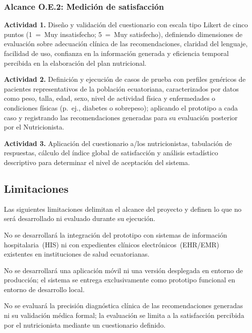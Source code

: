 \subsubsection{Alcance O.E.2: Medición de satisfacción}

\textbf{Actividad 1.} Diseño y validación del cuestionario con escala
tipo Likert de cinco puntos (1~=~Muy insatisfecho; 5~=~Muy satisfecho),
definiendo dimensiones de evaluación sobre adecuación clínica de las
recomendaciones, claridad del lenguaje, facilidad de uso, confianza
en la información generada y eficiencia temporal percibida en la
elaboración del plan nutricional.

\medskip

\textbf{Actividad 2.} Definición y ejecución de casos de prueba con
perfiles genéricos de pacientes representativos de la población
ecuatoriana, caracterizados por datos como peso, talla, edad, sexo,
nivel de actividad física y enfermedades o condiciones físicas
(p.~ej., diabetes o sobrepeso); aplicando el prototipo
a cada caso y registrando las recomendaciones generadas para su
evaluación posterior por el Nutricionista.

\medskip

\textbf{Actividad 3.} Aplicación del cuestionario a/los
nutricionistas, tabulación de respuestas, cálculo del índice global
de satisfacción y análisis estadístico descriptivo para determinar
el nivel de aceptación del sistema.

\subsection{Limitaciones}

Las siguientes limitaciones delimitan el alcance del proyecto y
definen lo que no será desarrollado ni evaluado durante su ejecución.

No se desarrollará la integración del prototipo con sistemas de
información hospitalaria~(HIS) ni con expedientes clínicos
electrónicos~(EHR/EMR) existentes en instituciones de salud
ecuatorianas.

No se desarrollará una aplicación móvil ni una versión desplegada
en entorno de producción; el sistema se entrega exclusivamente como
prototipo funcional en entorno de desarrollo local.

No se evaluará la precisión diagnóstica clínica de las recomendaciones
generadas ni su validación médica formal; la evaluación se limita a
la satisfacción percibida por el nutricionista mediante un cuestionario
definido.


